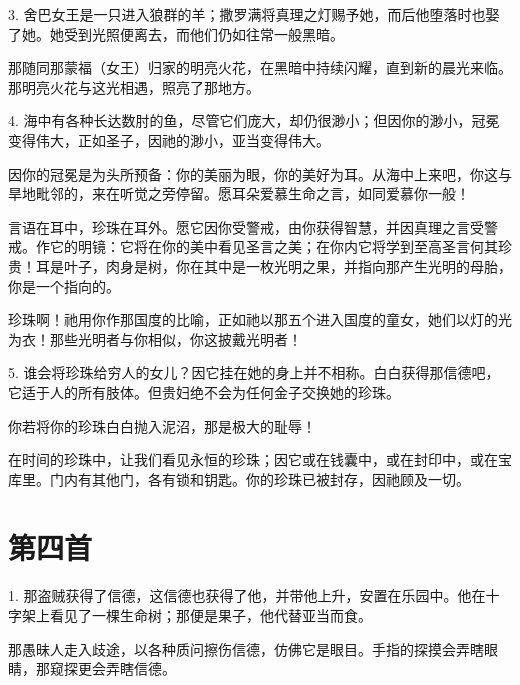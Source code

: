 3. 舍巴女王是一只进入狼群的羊；撒罗满将真理之灯赐予她，而后他堕落时也娶了她。她受到光照便离去，而他们仍如往常一般黑暗。\par

那随同那蒙福（女王）归家的明亮火花，在黑暗中持续闪耀，直到新的晨光来临。那明亮火花与这光相遇，照亮了那地方。\par

4. 海中有各种长达数肘的鱼，尽管它们庞大，却仍很渺小；但因你的渺小，冠冕变得伟大，正如圣子，因祂的渺小，亚当变得伟大。\par

因你的冠冕是为头所预备：你的美丽为眼，你的美好为耳。从海中上来吧，你这与旱地毗邻的，来在听觉之旁停留。愿耳朵爱慕生命之言，如同爱慕你一般！\par

言语在耳中，珍珠在耳外。愿它因你受警戒，由你获得智慧，并因真理之言受警戒。作它的明镜：它将在你的美中看见圣言之美；在你内它将学到至高圣言何其珍贵！耳是叶子，肉身是树，你在其中是一枚光明之果，并指向那产生光明的母胎，你是一个指向的。\par

珍珠啊！祂用你作那国度的比喻，正如祂以那五个进入国度的童女，她们以灯的光为衣！那些光明者与你相似，你这披戴光明者！\par

5. 谁会将珍珠给穷人的女儿？因它挂在她的身上并不相称。白白获得那信德吧，它适于人的所有肢体。但贵妇绝不会为任何金子交换她的珍珠。\par

你若将你的珍珠白白抛入泥沼，那是极大的耻辱！\par

在时间的珍珠中，让我们看见永恒的珍珠；因它或在钱囊中，或在封印中，或在宝库里。门内有其他门，各有锁和钥匙。你的珍珠已被封存，因祂顾及一切。\par


\section{第四首}

1. 那盗贼获得了信德，这信德也获得了他，并带他上升，安置在乐园中。他在十字架上看见了一棵生命树；那便是果子，他代替亚当而食。\par

那愚昧人走入歧途，以各种质问擦伤信德，仿佛它是眼目。手指的探摸会弄瞎眼睛，那窥探更会弄瞎信德。\par

